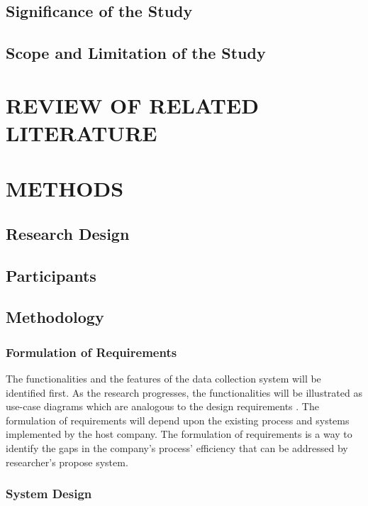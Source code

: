 \documentclass[12pt]{report}
\begin{document}
\section{Significance of the Study}

\section{Scope and Limitation of the Study}

\chapter{REVIEW OF RELATED LITERATURE}

\chapter{METHODS}

\section{Research Design}

\section{Participants}

\section{Methodology}

\subsection{Formulation of Requirements}

The functionalities and the features of the data collection system will be identified first.
As the research progresses, the functionalities will be illustrated as use-case diagrams which are analogous to the design requirements \cite{UseCase}.
The formulation of requirements will depend upon the existing process and systems implemented by the host company.
The formulation of requirements is a way to identify the gaps in the company's process' efficiency that can be addressed by researcher's propose system.

\subsection{System Design}
\end{document}

